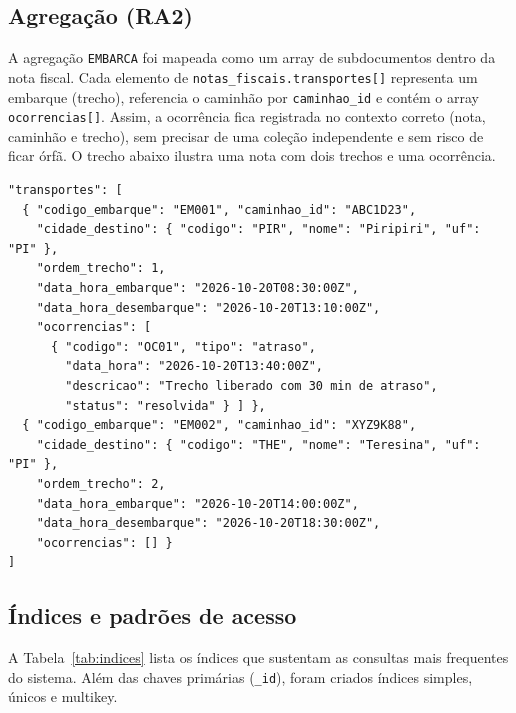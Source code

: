 \subsection{Agregação (RA2)}

A agregação \texttt{EMBARCA} foi mapeada como um array de subdocumentos dentro da nota fiscal. Cada elemento de \texttt{notas\_fiscais.transportes[]} representa um embarque (trecho), referencia o caminhão por \texttt{caminhao\_id} e contém o array \texttt{ocorrencias[]}. Assim, a ocorrência fica registrada no contexto correto (nota, caminhão e trecho), sem precisar de uma coleção independente e sem risco de ficar órfã. O trecho abaixo ilustra uma nota com dois trechos e uma ocorrência.

\needspace{9.5cm}
\begin{lstlisting}[caption={Nota fiscal com embarques e ocorrências aninhados},label={lst:agregacao}]
"transportes": [
  { "codigo_embarque": "EM001", "caminhao_id": "ABC1D23",
    "cidade_destino": { "codigo": "PIR", "nome": "Piripiri", "uf": "PI" },
    "ordem_trecho": 1,
    "data_hora_embarque": "2026-10-20T08:30:00Z",
    "data_hora_desembarque": "2026-10-20T13:10:00Z",
    "ocorrencias": [
      { "codigo": "OC01", "tipo": "atraso",
        "data_hora": "2026-10-20T13:40:00Z",
        "descricao": "Trecho liberado com 30 min de atraso",
        "status": "resolvida" } ] },
  { "codigo_embarque": "EM002", "caminhao_id": "XYZ9K88",
    "cidade_destino": { "codigo": "THE", "nome": "Teresina", "uf": "PI" },
    "ordem_trecho": 2,
    "data_hora_embarque": "2026-10-20T14:00:00Z",
    "data_hora_desembarque": "2026-10-20T18:30:00Z",
    "ocorrencias": [] }
]
\end{lstlisting}

\subsection{Índices e padrões de acesso}

A Tabela~\ref{tab:indices} lista os índices que sustentam as consultas mais frequentes do sistema. Além das chaves primárias (\texttt{\_id}), foram criados índices simples, únicos e multikey.

